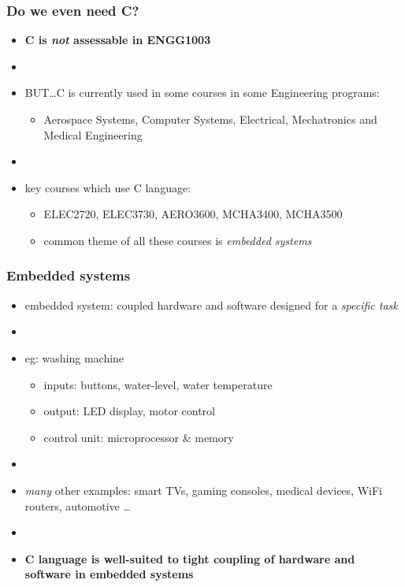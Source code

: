 \documentclass[english,14pt]{beamer}
\newcommand\red[1]{{\color{red} #1}}
\begin{document}
\begin{frame}[fragile]

\frametitle{Do we even need C?}

\begin{itemize}
	\item \textbf{C is \emph{not} assessable in ENGG1003}
	
	\item[]
	
	\item BUT\ldots C is currently used in some courses in some Engineering programs:
	\begin{itemize}
		\item Aerospace Systems, Computer Systems, Electrical, Mechatronics and Medical Engineering
	\end{itemize}
	
	\item[]
	\item key courses which use C language:
	\begin{itemize}
		\item ELEC2720, ELEC3730, AERO3600, MCHA3400, MCHA3500
		\item common theme of all these courses is \red{\emph{embedded systems}}
	\end{itemize}

\end{itemize}
\end{frame}


\begin{frame}[fragile]

\frametitle{Embedded systems}

\begin{itemize}
	\item embedded system: coupled hardware and software designed for a \emph{specific task}
	\item[]
	\item eg: washing machine
	\begin{itemize}
		\item inputs: buttons, water-level, water temperature
		\item output: LED display, motor control
		\item control unit: microprocessor \& memory		
	\end{itemize}
	\item[]
	\item \emph{many} other examples: smart TVs, gaming consoles, medical devices, WiFi routers,  automotive \ldots
	\item[]
	\item \textbf{C language is well-suited to tight coupling of hardware and software in embedded systems}
\end{itemize}

\end{frame}
\end{document}
